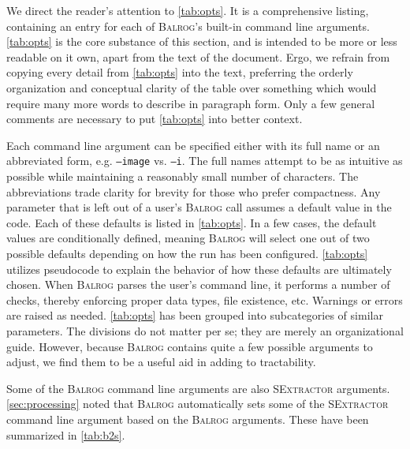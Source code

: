 \documentclass[11pt]{book}
\newcommand{\codett}[1]{\texttt{#1}}
\newcommand{\balrog}{\textsc{Balrog}}
\newcommand{\sex}{\textsc{SExtractor}}
\newcommand{\opt}[1]{\codett{--#1}}
\begin{document}
We direct the reader's attention to \autoref{tab:opts}.
It is a comprehensive listing, containing an entry for each of \balrog{}'s built-in command line arguments.
\autoref{tab:opts} is the core substance of this section,
and is intended to be more or less readable on it own, apart from the text of the document.
Ergo, we refrain from copying every detail from \autoref{tab:opts} into the text, 
preferring the orderly organization and conceptual clarity
of the table over something which would require many more words to describe in paragraph form.
Only a few general comments are necessary to put \autoref{tab:opts} into better context.

Each command line argument can be specified either with its full name or an abbreviated form, e.g. \opt{image} vs. \opt{i}.
The full names attempt to be as intuitive as possible while maintaining a reasonably small number of characters.
The abbreviations trade clarity for brevity for those who prefer compactness. 
Any parameter that  is left out of a user's \balrog{} call assumes a default value in the code.
Each of these defaults is listed in \autoref{tab:opts}. 
In a few cases, the default values are conditionally defined, meaning \balrog{} will select one out of
two possible defaults depending on how the run has been configured.
\autoref{tab:opts} utilizes pseudocode to explain the behavior of how these defaults are ultimately chosen.
When \balrog{} parses the user's command line, it performs a number of checks, 
thereby enforcing proper data types, file existence, etc.
Warnings or errors are raised as needed.
\autoref{tab:opts} has been grouped into subcategories of similar parameters.
The divisions do not matter per se; they are merely an organizational guide.
However, because \balrog{} contains quite a few possible arguments to adjust,
we find them to be a useful aid in adding to tractability.

Some of the \balrog{} command line arguments are also \sex{} arguments.
\autoref{sec:processing} noted that \balrog{} automatically sets some of the \sex{} command line argument based on the \balrog{} arguments.
These have been summarized in \autoref{tab:b2s}.
\end{document}
